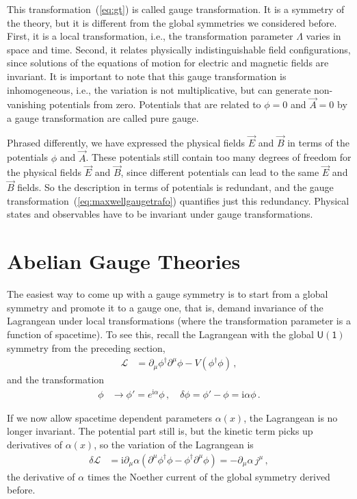 \documentclass[12pt]{report}
\renewcommand{\L}{\ensuremath{\mathscr{L}}}
\renewcommand{\i}{\ensuremath{\text{i}}}
\newcommand{\2}{\ensuremath{\sqrt{2}\,}}
\renewcommand{\L}{\ensuremath{\mathscr{L}}}
\begin{document}
{      This transformation~(\ref{eq:gt}) is called gauge transformation.
       It is a symmetry of the theory, but it
      is different from the global symmetries we considered before. First, it is a local
      transformation, i.e., the transformation parameter $\Lambda$ varies in space and
      time. Second, it relates physically indistinguishable field configurations, since solutions 
      of the equations of motion for electric and magnetic fields are
      invariant. It is important to note that this gauge transformation is inhomogeneous, i.e.,
      the variation is not multiplicative, but can generate non-vanishing potentials from zero.
      Potentials that are related to $\phi=0$ and $\vec{A}=0$ by a gauge
      transformation are called pure gauge.
      
      Phrased differently, we have expressed the physical fields $\vec{E}$ and $\vec{B}$ in terms 
      of the potentials $\phi$ and $\vec{A}$. These potentials still contain too many degrees of
      freedom for the
      physical fields $\vec{E}$ and $\vec{B}$, since different potentials can lead to the
      same  $\vec{E}$ and $\vec{B}$ fields. So the description in terms of potentials is
      redundant, and the gauge transformation~(\ref{eq:maxwellgaugetrafo}) quantifies just
      this redundancy. Physical states and observables have to be
      invariant under gauge transformations. 
      

    \section{Abelian Gauge Theories}
      The easiest way to come up with a gauge symmetry is to start from a global symmetry and promote
      it to a gauge one, that is, demand invariance of the Lagrangean under local
      transformations (where the transformation parameter is a function of spacetime). To see
      this, recall the Lagrangean with the global $\mathsf{U(1)}$ symmetry from the preceding
      section, 
      \begin{align*}
        \L&=\partial_\mu \phi^\dagger \partial^\mu\phi - V(\phi^\dagger\phi)\,,
      \end{align*}
      and the transformation
      \begin{align*}
        \phi&\to\phi' = e^{\i\alpha} \phi\,,\quad \delta\phi = \phi'-\phi = \i \alpha \phi\,.
      \end{align*}
      
      If we now allow spacetime dependent parameters $\alpha(x)$, the Lagrangean is no longer
      invariant. The potential part still is, but the kinetic term picks up derivatives of
      $\alpha(x)$, so the variation of the Lagrangean is
      \begin{align}
        \delta \L&= \i \partial_\mu \alpha \left(\partial^\mu\phi^\dagger \phi -\phi^\dagger
          \partial^\mu \phi\right) = -\partial_\mu\alpha \,j^\mu\,,
      \end{align}
      the derivative of $\alpha$ times the Noether current of the global symmetry derived
      before. 

}
\end{document}
